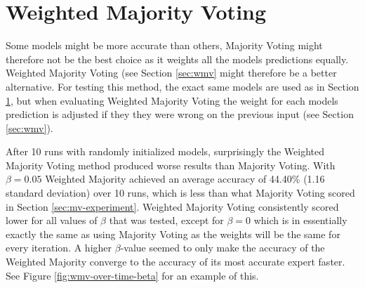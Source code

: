 \section{Weighted Majority Voting}
\label{sec:wmv-experiment}

Some models might be more accurate than others, Majority Voting might therefore not be the best choice as it weights all the models predictions equally. Weighted Majority Voting (see Section \ref{sec:wmv} might therefore be a better alternative. For testing this method, the exact same models are used as in Section \ref{sec:wmv-experiment}, but when evaluating Weighted Majority Voting the weight for each models prediction is adjusted if they they were wrong on the previous input (see Section \ref{sec:wmv}).

After 10 runs with randomly initialized models, surprisingly the Weighted Majority Voting method produced worse results than Majority Voting. With $\beta=0.05$ Weighted Majority achieved an average accuracy of 44.40\% (1.16 standard deviation) over 10 runs, which is less than what Majority Voting scored in Section \ref{sec:mv-experiment}. Weighted Majority Voting consistently scored lower for all values of $\beta$ that was tested, except for $\beta = 0$ which is in essentially exactly the same as using Majority Voting as the weights will be the same for every iteration. A higher $\beta$-value seemed to only make the accuracy of the Weighted Majority converge to the accuracy of its most accurate expert faster. See Figure \ref{fig:wmv-over-time-beta} for an example of this.

